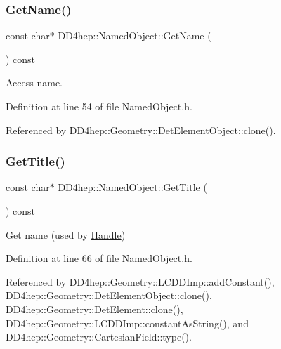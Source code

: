 \subsubsection{\texorpdfstring{Get\+Name()}{GetName()}}
{\footnotesize\ttfamily const char$\ast$ D\+D4hep\+::\+Named\+Object\+::\+Get\+Name (\begin{DoxyParamCaption}{ }\end{DoxyParamCaption}) const\hspace{0.3cm}{\ttfamily [inline]}}



Access name. 



Definition at line 54 of file Named\+Object.\+h.



Referenced by D\+D4hep\+::\+Geometry\+::\+Det\+Element\+Object\+::clone().

\hypertarget{class_d_d4hep_1_1_named_object_aabae2ba6d2686b9a172837817edc083a}{}\label{class_d_d4hep_1_1_named_object_aabae2ba6d2686b9a172837817edc083a} 
\subsubsection{\texorpdfstring{Get\+Title()}{GetTitle()}}
{\footnotesize\ttfamily const char$\ast$ D\+D4hep\+::\+Named\+Object\+::\+Get\+Title (\begin{DoxyParamCaption}{ }\end{DoxyParamCaption}) const\hspace{0.3cm}{\ttfamily [inline]}}



Get name (used by \hyperlink{class_d_d4hep_1_1_handle}{Handle}) 



Definition at line 66 of file Named\+Object.\+h.



Referenced by D\+D4hep\+::\+Geometry\+::\+L\+C\+D\+D\+Imp\+::add\+Constant(), D\+D4hep\+::\+Geometry\+::\+Det\+Element\+Object\+::clone(), D\+D4hep\+::\+Geometry\+::\+Det\+Element\+::clone(), D\+D4hep\+::\+Geometry\+::\+L\+C\+D\+D\+Imp\+::constant\+As\+String(), and D\+D4hep\+::\+Geometry\+::\+Cartesian\+Field\+::type().

\hypertarget{class_d_d4hep_1_1_named_object_a474ed41e8d8b480401671dfe07b33eb6}{}\label{class_d_d4hep_1_1_named_object_a474ed41e8d8b480401671dfe07b33eb6} 
